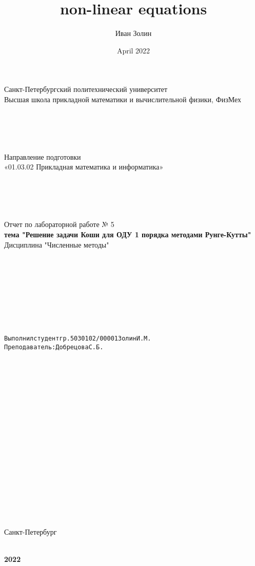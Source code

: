 \documentclass{article}
\title{non-linear equations}
\author{Иван Золин}
\date{April 2022}
\begin{document}
	
	\large
	\begin{center}
		
		Санкт-Петербургский политехнический университет\\
		Высшая школа прикладной математики и вычислительной физики, ФизМех
		
		~\\
		~\\
		~\\
		~\\
		Направление подготовки\\
		«01.03.02 Прикладная математика и информатика»
		
		~\\
		~\\
		~\\
		~\\
		Отчет по лабораторной работе № 5\\
		\textbf{тема "Решение задачи Коши для ОДУ 1 порядка методами Рунге-Кутты" }	
		~\\	Дисциплина "Численные методы"
	\end{center}
	
	~\\
	~\\
	~\\
	~\\
	~\\
	~\\
	~\\
	\begin{alltt}
		\begin{center}
			Выполнил студент гр. 5030102/00001			  		   		  Золин И.М.
			Преподаватель: 				              	        	Добрецова С.Б.
		\end{center}
		
	\end{alltt}
	
	~\\
	~\\
	~\\
	~\\
	~\\
	~\\
	~\\
	~\\
	~\\
	~\\
	~\\
	~\\
	~\\
	~\\
	~\\
	~\\
	\begin{center}
		Санкт-Петербург
		
		~\\
		\textbf{2022}
		
	\end{center}{}
	
\end{document}
